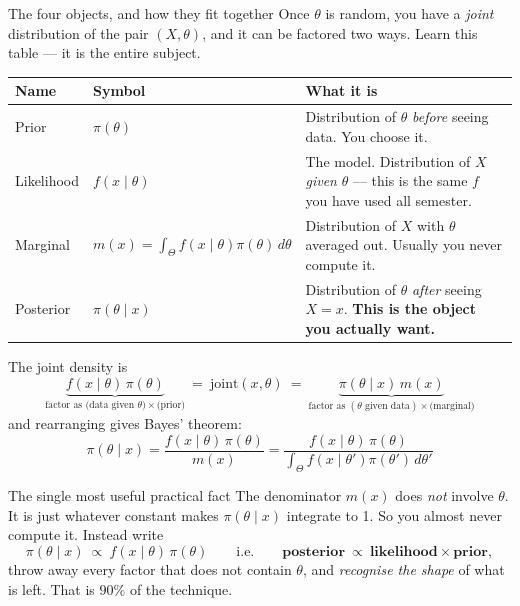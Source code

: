 \documentclass[11pt]{article}
\begin{document}
\begin{idea}{The four objects, and how they fit together}
Once $\theta$ is random, you have a \emph{joint} distribution of the pair $(X,\theta)$, and it
can be factored two ways. Learn this table --- it is the entire subject.
\begin{center}
\renewcommand{\arraystretch}{1.5}
\begin{tabular}{@{}llp{7.6cm}@{}}
\toprule
\textbf{Name} & \textbf{Symbol} & \textbf{What it is} \\
\midrule
Prior & $\pi(\theta)$ & Distribution of $\theta$ \emph{before} seeing data. You choose it. \\
Likelihood & $f(x\mid\theta)$ & The model. Distribution of $X$ \emph{given} $\theta$ --- this
is the same $f$ you have used all semester. \\
Marginal & $m(x)=\displaystyle\int_\Theta f(x\mid\theta)\pi(\theta)\,d\theta$ &
Distribution of $X$ with $\theta$ averaged out. Usually you never compute it. \\
Posterior & $\pi(\theta\mid x)$ & Distribution of $\theta$ \emph{after} seeing $X=x$.
\textbf{This is the object you actually want.} \\
\bottomrule
\end{tabular}
\end{center}
The joint density is
\[
\underbrace{f(x\mid\theta)\,\pi(\theta)}_{\text{factor as (data given }\theta)\times\text{(prior)}}
\ =\ \text{joint}(x,\theta)\ =\
\underbrace{\pi(\theta\mid x)\,m(x)}_{\text{factor as }(\theta\text{ given data})\times\text{(marginal)}}
\]
and rearranging gives Bayes' theorem:
\[
\boxed{\ \pi(\theta\mid x)=\frac{f(x\mid\theta)\,\pi(\theta)}{m(x)}
=\frac{f(x\mid\theta)\,\pi(\theta)}{\int_\Theta f(x\mid\theta')\pi(\theta')\,d\theta'}\ }
\]
\end{idea}

\begin{idea}{The single most useful practical fact}
The denominator $m(x)$ does \emph{not} involve $\theta$. It is just whatever constant makes
$\pi(\theta\mid x)$ integrate to 1. So you almost never compute it. Instead write
\[
\pi(\theta\mid x)\ \propto\ f(x\mid\theta)\,\pi(\theta)
\qquad\text{i.e.}\qquad
\textbf{posterior}\ \propto\ \textbf{likelihood}\times\textbf{prior},
\]
throw away every factor that does not contain $\theta$, and \emph{recognise the shape} of what
is left. That is $90\%$ of the technique.
\end{idea}

\end{document}
